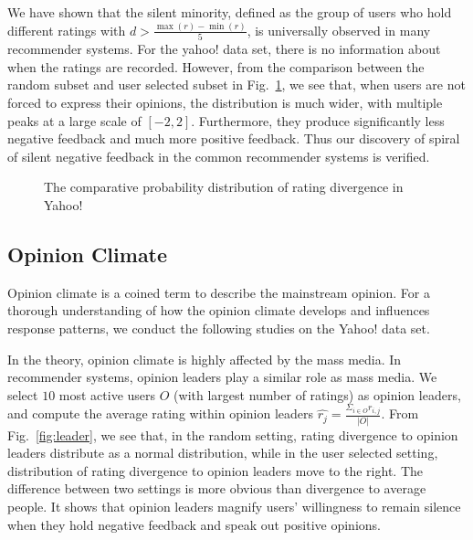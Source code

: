 \documentclass[sigconf]{acmart}
\begin{document}
We have shown that the silent minority, defined as the group of users who hold different ratings with $d>\frac{\max(r)-\min(r)}{5}$, is universally observed in many recommender systems. For the yahoo! data set, there is no information about when the ratings are recorded. However, from the comparison between the random subset and user selected subset in Fig.~\ref{fig:yahoo}, we see that, when users are not forced to express their opinions, the distribution is much wider, with multiple peaks at a large scale of $[-2,2]$. Furthermore, they produce significantly less negative feedback and much more positive feedback. Thus our discovery of spiral of silent negative feedback in the common recommender systems is  verified.

\begin{figure}[htbp]
\centering
\centering
{}
\caption{The comparative probability distribution of rating divergence in Yahoo!}\label{fig:yahoo}
\end{figure}

\subsection{Opinion Climate}
Opinion climate is a coined term to describe the mainstream opinion. For a thorough understanding of how the opinion climate develops and influences response patterns, we conduct the following studies on the Yahoo! data set.

In the theory, opinion climate is highly affected by the mass media. In recommender systems, opinion leaders play a similar role as mass media. We select $10$ most active users $O$ (with largest number of ratings) as opinion leaders, and compute the average rating within opinion leaders $\hat{r_j}=\frac{\Sigma_{i\in O}r_{i,j}}{|O|}$. From Fig.~\ref{fig:leader}, we see that, in the random setting, rating divergence to opinion leaders distribute as a normal distribution, while in the user selected setting, distribution of rating divergence to opinion leaders move to the right. The difference between two settings is more obvious than divergence to average people. It shows that opinion leaders magnify users' willingness to remain silence when they hold negative feedback and speak out positive opinions.
\end{document}
